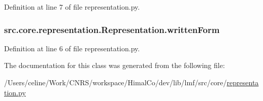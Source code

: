 Definition at line 7 of file representation.\+py.

\hypertarget{classsrc_1_1core_1_1representation_1_1_representation_ad4ec4b05057384573370ea9513f16a8f}{
\subsubsection[{written\+Form}]{\setlength{\rightskip}{0pt plus 5cm}src.\+core.\+representation.\+Representation.\+written\+Form}}\label{classsrc_1_1core_1_1representation_1_1_representation_ad4ec4b05057384573370ea9513f16a8f}


Definition at line 6 of file representation.\+py.



The documentation for this class was generated from the following file\+:\begin{DoxyCompactItemize}
\item 
/\+Users/celine/\+Work/\+C\+N\+R\+S/workspace/\+Himal\+Co/dev/lib/lmf/src/core/\hyperlink{representation_8py}{representation.\+py}\end{DoxyCompactItemize}
